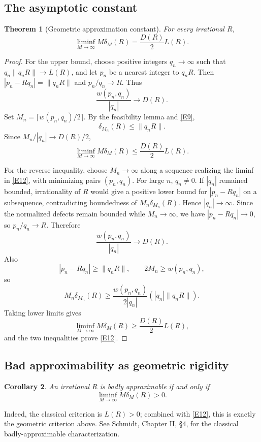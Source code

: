 \documentclass[12pt]{article}
\newtheorem{theorem}{Theorem}[section]
\newtheorem{corollary}[theorem]{Corollary}
\begin{document}
\subsection{The asymptotic constant}
\begin{theorem}[Geometric approximation constant]
For every irrational $R$,
\begin{equation}\tag{E12}\label{E12}
\liminf_{M\to\infty}M\delta_M(R)=\frac{D(R)}{2}L(R).
\end{equation}
\end{theorem}

\begin{proof}
For the upper bound, choose positive integers $q_n\to\infty$ such that
$q_n\lVert q_nR\rVert\to L(R)$, and let $p_n$ be a nearest integer to $q_nR$. Then
$|p_n-Rq_n|=\lVert q_nR\rVert$ and $p_n/q_n\to R$. Thus
\[
\frac{w(p_n,q_n)}{|q_n|}\to D(R).
\]
Set $M_n=\lceil w(p_n,q_n)/2\rceil$. By the feasibility lemma and \eqref{E9},
\[
\delta_{M_n}(R)\le\lVert q_nR\rVert.
\]
Since $M_n/|q_n|\to D(R)/2$,
\[
\liminf_{M\to\infty}M\delta_M(R)\le\frac{D(R)}2L(R).
\]

For the reverse inequality, choose $M_n\to\infty$ along a sequence realizing the liminf in \eqref{E12}, with minimizing pairs $(p_n,q_n)$. For large $n$, $q_n\neq0$. If $|q_n|$ remained bounded, irrationality of $R$ would give a positive lower bound for $|p_n-Rq_n|$ on a subsequence, contradicting boundedness of $M_n\delta_{M_n}(R)$. Hence $|q_n|\to\infty$. Since the normalized defects remain bounded while $M_n\to\infty$, we have $|p_n-Rq_n|\to0$, so $p_n/q_n\to R$. Therefore
\[
\frac{w(p_n,q_n)}{|q_n|}\to D(R).
\]
Also
\[
|p_n-Rq_n|\ge\lVert q_nR\rVert,
\qquad
2M_n\ge w(p_n,q_n),
\]
so
\[
M_n\delta_{M_n}(R)
\ge
\frac{w(p_n,q_n)}{2|q_n|}
\left(|q_n|\lVert q_nR\rVert\right).
\]
Taking lower limits gives
\[
\liminf_{M\to\infty}M\delta_M(R)
\ge\frac{D(R)}2L(R),
\]
and the two inequalities prove \eqref{E12}.
\end{proof}

\subsection{Bad approximability as geometric rigidity}
\begin{corollary}
An irrational $R$ is badly approximable if and only if
\[
\liminf_{M\to\infty}M\delta_M(R)>0.
\]
\end{corollary}

Indeed, the classical criterion is $L(R)>0$; combined with \eqref{E12}, this is exactly the geometric criterion above. See Schmidt, Chapter II, \S4, for the classical badly-approximable characterization.
\end{document}
